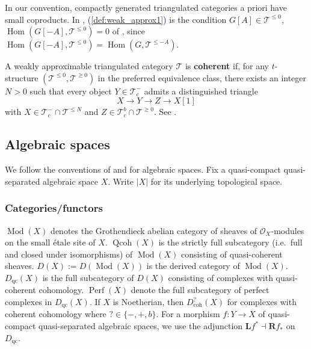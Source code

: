 \documentclass[11pt]{amsart}
\def\eqref#1{\textcolor{darkblue}{(\ref{#1})}}
\theoremstyle{plain}
\theoremstyle{definition}
\numberwithin{equation}{section}
\numberwithin{theorem}{section}
\begin{document}
In our convention, compactly generated triangulated categories a priori have small coproducts.
In , \eqref{def:weak_approx1} is the condition $G[A]\in \mathcal{T}^{\leq 0}$, $\operatorname{Hom}(G[-A],\mathcal{T}^{\leq 0})=0$ of \cite[2.9]{Burke/Neeman/Pauwels:2023}, since $\operatorname{Hom}(G[-A],\mathcal{T}^{\leq 0}) = \operatorname{Hom}(G,\mathcal{T}^{\leq -A})$.

A weakly approximable triangulated category $\mathcal{T}$ is \textbf{coherent} if, for any $t$-structure $(\mathcal{T}^{\leq 0}, \mathcal{T}^{\geq 0})$ in the preferred equivalence class, there exists an integer $N > 0$ such that every object $Y \in \mathcal{T}^-_c$ admits a distinguished triangle 
\begin{displaymath}
    X \to Y \to Z \to X[1]
\end{displaymath}
with $X \in \mathcal{T}^-_c \cap \mathcal{T}^{\leq N}$ and $Z\in \mathcal{T}^b_c \cap \mathcal{T}^{\geq 0}$.
See \cite[Definition 10.1.1]{Canonaco/Haesemeyer/Neeman/Stellari:2024}.

\subsection{Algebraic spaces}
\label{sec:algebraic_stacks}

We follow the conventions of \cite{StacksProject} and \cite[\S 2.2]{GuisadoVillaalgordo/Lank:2026} for algebraic spaces. 
Fix a quasi-compact quasi-separated algebraic space $X$. 
Write $|X|$ for its underlying topological space.

\subsubsection{Categories/functors}
\label{sec:prelim_stacks_categories_functors}

$\operatorname{Mod}(X)$ denotes the Grothendieck abelian category of sheaves of $\mathcal{O}_X$-modules on the small \'{e}tale site of $X$. 
$\operatorname{Qcoh}(X)$ is the strictly full subcategory (i.e.\ full and closed under isomorphisms) of $\operatorname{Mod}(X)$ consisting of quasi-coherent sheaves. 
$D(X) := D(\operatorname{Mod}(X))$ is the derived category of $\operatorname{Mod}(X)$.
$D_{\operatorname{qc}}(X)$ is the full subcategory of $D(X)$ consisting of complexes with quasi-coherent cohomology. 
$\operatorname{Perf}(X)$ denote the full subcategory of perfect complexes in $D_{\operatorname{qc}}(X)$. 
If $X$ is Noetherian, then $D^?_{\operatorname{coh}}(X)$ for complexes with coherent cohomology where $?\in \{-,+,b\}$. 
For a morphism $f\colon Y\to X$ of quasi-compact quasi-separated algebraic spaces, we use the adjunction $\mathbf{L}f^\ast\dashv\mathbf{R}f_\ast$ on $D_{\operatorname{qc}}$.
\end{document}
